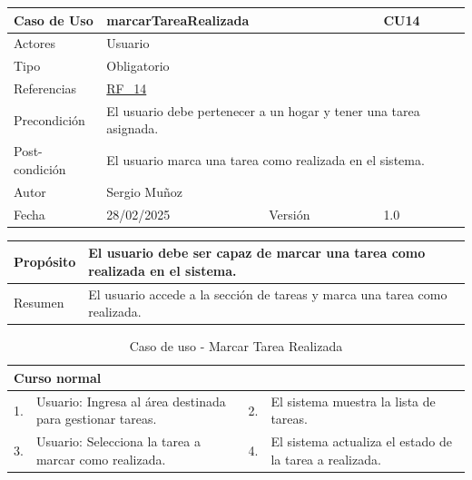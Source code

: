 \begin{table}[H]
    \centering
    \begin{tabular}{| m{} | m{} | m{} | m{} |}
        \hline
        \rowcolor[HTML]{C0C0C0} Caso de Uso & \multicolumn{2}{|m{0.43\textwidth}|}{marcarTareaRealizada} &  CU14\\ 
        \hline
        Actores & \multicolumn{3}{l|}{Usuario} \\ 
        \hline
        Tipo & \multicolumn{3}{l|}{Obligatorio} \\ 
        \hline
        Referencias & \multicolumn{3}{l|}{\hyperref[req:RF14]{RF\_14}} \\ 
        \hline
        Precondición & \multicolumn{3}{m{0.67\textwidth}|}{El usuario debe pertenecer a un hogar y tener una tarea asignada.} \\ 
        \hline
        Post-condición & \multicolumn{3}{m{0.67\textwidth}|}{El usuario marca una tarea como realizada en el sistema.} \\ 
        \hline
        Autor & \multicolumn{3}{l|}{Sergio Muñoz} \\ 
        \hline
        Fecha & 28/02/2025 & Versión & 1.0 \\ 
        \hline
    \end{tabular}
\end{table}

\begin{table}[H]
    \centering
    \begin{tabular}{| m{} | m{} | m{} | m{} |}
        \hline
        Propósito & \multicolumn{3}{m{0.67\textwidth}|}{El usuario debe ser capaz de marcar una tarea como realizada en el sistema.} \\ 
        \hline
        Resumen & \multicolumn{3}{m{0.67\textwidth}|}{El usuario accede a la sección de tareas y marca una tarea como realizada.} \\ 
        \hline
    \end{tabular}
\end{table}

\begin{table}[H]
    \centering
    \begin{tabular}{| m{} | m{} | m{} | m{} |}
        \hline
        \multicolumn{4}{|m{0.9\textwidth}|}{Curso normal} \\ 
        \hline
        1. & Usuario: Ingresa al área destinada para gestionar tareas.
        & 2. & El sistema muestra la lista de tareas. \\ 
        \hline
        3. & Usuario: Selecciona la tarea a marcar como realizada. 
        & 4. & El sistema actualiza el estado de la tarea a realizada. \\ 
        \hline
    \end{tabular}
    \caption{Caso de uso - Marcar Tarea Realizada}
\end{table}

